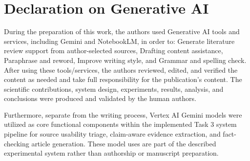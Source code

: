 \documentclass[
]{ceurart}
\begin{document}
\section*{Declaration on Generative AI}
During the preparation of this work, the authors used Generative AI tools and services, including Gemini and NotebookLM, in order to: Generate literature review support from author-selected sources, Drafting content assistance, Paraphrase and reword, Improve writing style, and Grammar and spelling check. After using these tools/services, the authors reviewed, edited, and verified the content as needed and take full responsibility for the publication's content. The scientific contributions, system design, experiments, results, analysis, and conclusions were produced and validated by the human authors.

Furthermore, separate from the writing process, Vertex AI Gemini models were utilized as core functional components within the implemented Task 3 system pipeline for source usability triage, claim-aware evidence extraction, and fact-checking article generation. These model uses are part of the described experimental system rather than authorship or manuscript preparation.





\end{document}
